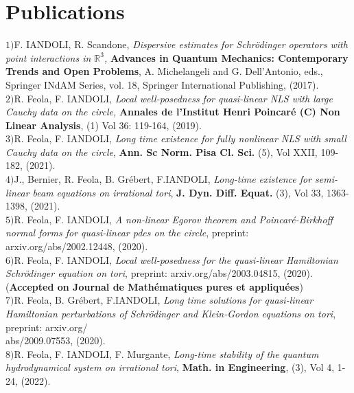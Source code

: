 \documentclass[margin,line,pifont,palatino,courier]{res}
\begin{document}
\section{Publications}
$1) ${\rm{F. IANDOLI, R. Scandone}},  \textit{Dispersive estimates for Schr\"odinger operators with point interactions in $\mathbb{R}^3$,}  {\textbf {Advances in Quantum Mechanics: Contemporary Trends and Open Problems}}, A. Michelangeli and G. Dell'Antonio, eds., Springer INdAM Series, vol. 18, Springer International Publishing, (2017).\vspace{0.1cm}\\
$2) ${\rm{R. Feola, F. IANDOLI}},  \textit{Local well-posedness for quasi-linear NLS with large Cauchy data on the circle,}  \textbf{Annales de l'Institut Henri Poincar\'e (C) Non Linear Analysis}, (1) Vol 36: 119-164, (2019).\vspace{0.1cm}\\
$3) ${\rm{R. Feola, F. IANDOLI}}, \textit{Long time existence for fully nonlinear NLS with small Cauchy data on the circle},   \textbf{Ann. Sc Norm.  Pisa Cl. Sci.} (5), Vol XXII, 109-182, (2021).\vspace{0.1cm}\\
$4) ${\rm{J., Bernier, R. Feola, B. Gr\'ebert, F.IANDOLI}}, \textit{Long-time existence for semi-linear beam equations on irrational tori},  \textbf{J. Dyn. Diff. Equat.} (3), Vol 33, 1363-1398, (2021). \vspace{0.1cm}\\
$5) ${\rm{R. Feola, F. IANDOLI}}, \textit{A non-linear Egorov theorem and Poincar\'e-Birkhoff normal forms for quasi-linear pdes on the circle}, preprint: arxiv.org/abs/2002.12448, (2020).\vspace{0.1cm}\\
$6) ${\rm{R. Feola, F. IANDOLI}}, \textit{Local well-posedness for the quasi-linear Hamiltonian Schr\"odinger equation on tori}, preprint: arxiv.org/abs/2003.04815, (2020). (\textbf{Accepted on Journal de Math\'ematiques pures et appliqu\'ees})\vspace{0.1cm}\\
$7) ${\rm{R. Feola, B. Gr\'ebert, F.IANDOLI}}, \textit{Long time solutions for quasi-linear Hamiltonian perturbations of Schr\"odinger and Klein-Gordon equations on tori}, preprint: arxiv.org/\\abs/2009.07553, (2020). \vspace{0.1cm}\\
$8) ${\rm{R. Feola, F. IANDOLI, F. Murgante}}, \textit{Long-time stability of the quantum hydrodynamical system on irrational tori}, \textbf{Math. in Engineering}, (3), Vol 4, 1-24, (2022).\vspace{0.1cm}\\
\end{document}

